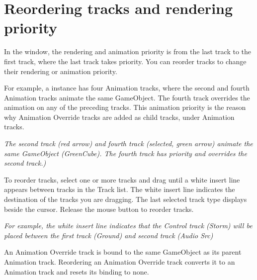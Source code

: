 \chapter{Reordering tracks and rendering priority}
\hypertarget{md__hey_tea_9_2_library_2_package_cache_2com_8unity_8timeline_0d1_87_85_2_documentation_0i_2trk__reorder}{}\label{md__hey_tea_9_2_library_2_package_cache_2com_8unity_8timeline_0d1_87_85_2_documentation_0i_2trk__reorder}
\label{md__hey_tea_9_2_library_2_package_cache_2com_8unity_8timeline_0d1_87_85_2_documentation_0i_2trk__reorder_autotoc_md4762}%
%
 In the  window, the rendering and animation priority is from the last track to the first track, where the last track takes priority. You can reorder tracks to change their rendering or animation priority.

For example, a  instance has four Animation tracks, where the second and fourth Animation tracks animate the same Game\+Object. The fourth track overrides the animation on any of the preceding tracks. This animation priority is the reason why Animation Override tracks are added as child tracks, under Animation tracks.



{\itshape The second track (red arrow) and fourth track (selected, green arrow) animate the same Game\+Object (Green\+Cube). The fourth track has priority and overrides the second track.)}

To reorder tracks, select one or more tracks and drag until a white insert line appears between tracks in the Track list. The white insert line indicates the destination of the tracks you are dragging. The last selected track type displays beside the cursor. Release the mouse button to reorder tracks.



{\itshape For example, the white insert line indicates that the Control track (Storm) will be placed between the first track (Ground) and second track (Audio Src)}

An Animation Override track is bound to the same Game\+Object as its parent Animation track. Reordering an Animation Override track converts it to an Animation track and resets its binding to none. 